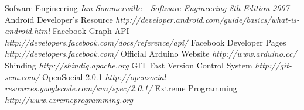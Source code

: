 \begin{thebibliography}{99}
 Sofware Engineering {\em Ian Sommerwille - Software Engineering 8th Edition 2007}
 Android Developer's Resource  {\em http://developer.android.com/guide/basics/what-is-android.html}
 Facebook Graph API {\em http://developers.facebook.com/docs/reference/api/}
 Facebook Developer Pages {\em http://developers.facebook.com/}
 Official Arduino Website {\em http://www.arduino.cc/}
 Shinding {\em http://shindig.apache.org}
 GIT Fast Version Control System {\em http://git-scm.com/}
 OpenSocial 2.0.1 {\em http://opensocial-resources.googlecode.com/svn/spec/2.0.1/}
 Extreme Programming {\em http://www.exremeprogramming.org}
\end{thebibliography}